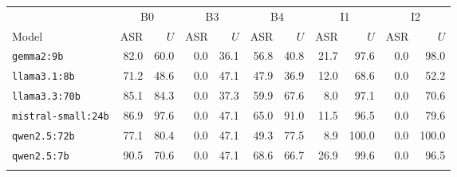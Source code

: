 \begin{tabular}{@{}lrrrrrrrrrr@{}}
\toprule
 & \multicolumn{2}{c}{B0} & \multicolumn{2}{c}{B3} & \multicolumn{2}{c}{B4} & \multicolumn{2}{c}{I1} & \multicolumn{2}{c}{I2} \\
Model & ASR & $U$ & ASR & $U$ & ASR & $U$ & ASR & $U$ & ASR & $U$ \\
\midrule
\texttt{gemma2:9b} & 82.0 & 60.0 & 0.0 & 36.1 & 56.8 & 40.8 & 21.7 & 97.6 & 0.0 & 98.0 \\
\texttt{llama3.1:8b} & 71.2 & 48.6 & 0.0 & 47.1 & 47.9 & 36.9 & 12.0 & 68.6 & 0.0 & 52.2 \\
\texttt{llama3.3:70b} & 85.1 & 84.3 & 0.0 & 37.3 & 59.9 & 67.6 & 8.0 & 97.1 & 0.0 & 70.6 \\
\texttt{mistral-small:24b} & 86.9 & 97.6 & 0.0 & 47.1 & 65.0 & 91.0 & 11.5 & 96.5 & 0.0 & 79.6 \\
\texttt{qwen2.5:72b} & 77.1 & 80.4 & 0.0 & 47.1 & 49.3 & 77.5 & 8.9 & 100.0 & 0.0 & 100.0 \\
\texttt{qwen2.5:7b} & 90.5 & 70.6 & 0.0 & 47.1 & 68.6 & 66.7 & 26.9 & 99.6 & 0.0 & 96.5 \\
\botrule
\end{tabular}

